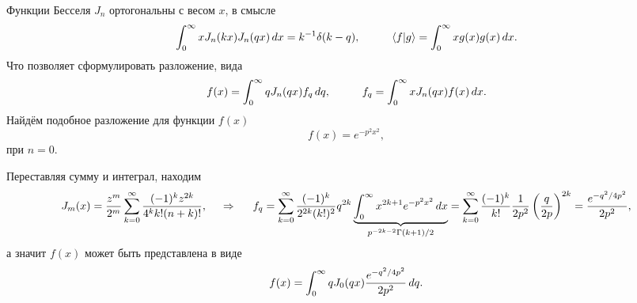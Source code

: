 Функции Бесселя $J_n$ ортогональны с весом $x$, в смысле
\begin{equation*}
    \int_{0}^{\infty} x J_n (kx) J_n (qx) \d x = k^{-1} \delta(k-q),
    \hspace{10 mm} 
    \bk{f}{g} = \int_{0}^{\infty} x g(x) g(x) \d x.
\end{equation*}
Что позволяет сформулировать разложение, вида
\begin{equation*}
    f(x) = \int_{0}^{\infty} q J_n (qx) f_q \d q,
    \hspace{10 mm} 
    f_q = \int_{0}^{\infty} x J_n (q x) f(x) \d x.
\end{equation*}
Найдём подобное разложение для функции $f(x)$
\begin{equation*}
    f(x) = e^{- p^2 x^2},
\end{equation*}
при $n = 0$. 


Переставляя сумму и интеграл, находим
\begin{equation*}
    J_m (x) = \frac{z^m}{2^m}\sum_{k=0}^{\infty} \frac{(-1)^k z^{2k}}{4^k k ! (n + k)!},
    \hspace{0.5cm} \Rightarrow \hspace{0.5cm}
    f_q = \sum_{k=0}^{\infty}  \frac{(-1)^k }{2^{2k} (k!)^2} q^{2k}
     \underbrace{\int_{0}^{\infty} x^{2k+1} e^{-p^2 x^2} \, d x}_{p^{-2k-2} \Gamma(k+1) /2} = 
     \sum_{k=0}^{\infty} 
     \frac{(-1)^k}{k!} \frac{1}{2p^2}\left(\frac{q}{2p}\right)^{2k} = \frac{e^{-q^2/4 p^2}}{2 p^2}
     ,
\end{equation*}
а значит $f(x)$ может быть представлена в виде
\begin{equation*}
    f(x) = \int_{0}^{\infty} q J_0 (qx) 
    \frac{e^{-q^2/4 p^2}}{2 p^2}
    \, d q.
\end{equation*}